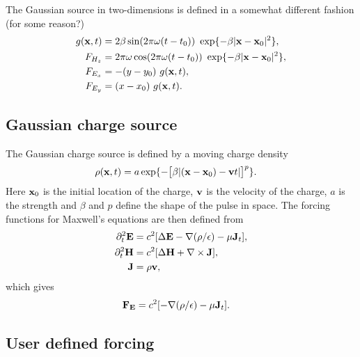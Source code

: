 \noindent The Gaussian source in two-dimensions is defined in a somewhat different fashion (for some reason?)
\begin{align*}
   g(\mathbf{ x},t) & = 2 \beta \sin(2 \pi \omega(t-t_0)) ~\exp\{ -\beta |\mathbf{ x}-\mathbf{ x}_0|^2 \}, \\
   F_{H_z} &= 2 \pi\omega \cos(2 \pi \omega(t-t_0)) ~\exp\{ -\beta |\mathbf{ x}-\mathbf{ x}_0|^2 \}, \\
   F_{E_x} &= -(y-y_0)~g(\mathbf{ x},t), \\ 
   F_{E_y} &=  (x-x_0)~g(\mathbf{ x},t) .
\end{align*}


\subsection{Gaussian charge source} \label{sec:gaussianChargeSource}

The Gaussian charge source is defined by a moving charge density 
\begin{align}
  \rho(\mathbf{ x},t) &= a \exp\{ - \big[\beta| (\mathbf{ x}-\mathbf{ x}_0) - \mathbf{ v} t |\big]^p \}.
\end{align}
Here $\mathbf{ x}_0$ is the initial location of the charge, $\mathbf{ v}$ is the velocity of the charge, $a$ is the strength and $\beta$ and $p$ define the
shape of the pulse in space.
The forcing functions for Maxwell's equations are then defined from
\begin{align}
    \partial_t^2 \mathbf{ E} &= c^2 [ \Delta \mathbf{ E} - \nabla(\rho/\epsilon) - \mu \mathbf{ J}_t ], \\
    \partial_t^2 \mathbf{ H} &= c^2 [ \Delta \mathbf{ H} + \nabla\times\mathbf{ J} ], \\
     \mathbf{ J} & = \rho \mathbf{ v} ,
\end{align}
which gives 
\begin{align}
   \mathbf{ F}_{\mathbf{ E}} &= c^2 [  - \nabla(\rho/\epsilon) - \mu \mathbf{ J}_t ].
\end{align}

\subsection{User defined forcing} \label{sec:userDefinedForcing}



